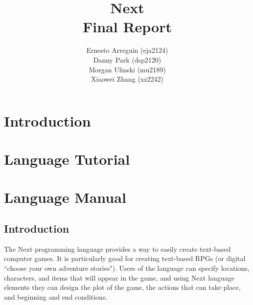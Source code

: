 \documentclass[12pt]{article}
\begin{document}
\title{\textbf{Next} \\ Final Report}
\author{Ernesto Arreguin (eja2124) \\Danny Park (dsp2120) \\Morgan Ulinski (mu2189) \\Xiaowei Zhang (xz2242)}
\date{}
\maketitle

\pagebreak

\tableofcontents

\section{Introduction}
\section{Language Tutorial}
\section{Language Manual}

\subsection{Introduction}
The Next programming language provides a way to easily create text-based computer games.  It is particularly good for creating text-based RPGs (or digital ``choose your own adventure stories").  Users of the language can specify locations, characters, and items that will appear in the game, and using Next language elements they can design the plot of the game, the actions that can take place, and beginning and end conditions.
\end{document}
